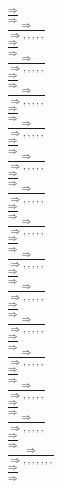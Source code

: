 \documentclass[11pt]{article}
\begin{document}
\begin{center}
\bigskip
\\$\frac{\Rightarrow }{\Rightarrow }$
\bigskip
\\$\frac{\Rightarrow }{\Rightarrow , , , , , }$
\bigskip
\\$\frac{\Rightarrow }{\Rightarrow }$
\bigskip
\\$\frac{\Rightarrow }{\Rightarrow , , , , , }$
\bigskip
\\$\frac{\Rightarrow }{\Rightarrow }$
\bigskip
\\$\frac{\Rightarrow }{\Rightarrow , , , , , }$
\bigskip
\\$\frac{\Rightarrow }{\Rightarrow }$
\bigskip
\\$\frac{\Rightarrow }{\Rightarrow , , , , , }$
\bigskip
\\$\frac{\Rightarrow }{\Rightarrow }$
\bigskip
\\$\frac{\Rightarrow }{\Rightarrow , , , , , }$
\bigskip
\\$\frac{\Rightarrow }{\Rightarrow }$
\bigskip
\\$\frac{\Rightarrow }{\Rightarrow , , , , , }$
\bigskip
\\$\frac{\Rightarrow }{\Rightarrow }$
\bigskip
\\$\frac{\Rightarrow }{\Rightarrow , , , , , }$
\bigskip
\\$\frac{\Rightarrow }{\Rightarrow }$
\bigskip
\\$\frac{\Rightarrow }{\Rightarrow , , , , , }$
\bigskip
\\$\frac{\Rightarrow }{\Rightarrow }$
\bigskip
\\$\frac{\Rightarrow }{\Rightarrow , , , , , }$
\bigskip
\\$\frac{\Rightarrow }{\Rightarrow }$
\bigskip
\\$\frac{\Rightarrow }{\Rightarrow , , , , , }$
\bigskip
\\$\frac{\Rightarrow }{\Rightarrow }$
\bigskip
\\$\frac{\Rightarrow }{\Rightarrow , , , , , }$
\bigskip
\\$\frac{\Rightarrow }{\Rightarrow }$
\bigskip
\\$\frac{\Rightarrow }{\Rightarrow , , , , , }$
\bigskip
\\$\frac{\Rightarrow }{\Rightarrow }$
\bigskip
\\$\frac{\Rightarrow }{\Rightarrow , , , , , }$
\bigskip
\\$\frac{\Rightarrow }{\Rightarrow }$
\bigskip
\\$\frac{\Rightarrow }{\Rightarrow , , , , , , , }$
\bigskip
\\$\frac{\Rightarrow }{\Rightarrow }$

\end{center}
\end{document}
